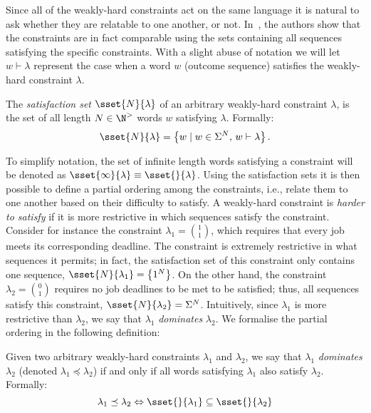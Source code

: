 Since all of the weakly-hard constraints act on the same language it is natural to ask whether they are relatable to one another, or not.
In~\cite{Bernat:2001}, the authors show that the constraints are in fact comparable using the sets containing all sequences satisfying the specific constraints.
With a slight abuse of notation we will let $w \vdash \lambda$ represent the case when a word $w$ (outcome sequence) satisfies the weakly-hard constraint $\lambda$.
%
\begin{definition}
    The \emph{satisfaction set} $\sset{N}{\lambda}$ of an arbitrary weakly-hard constraint $\lambda$, is the set of all length $N \in \N^{>}$ words $w$ satisfying $\lambda$.
    Formally:
    \begin{equation}
        \sset{N}{\lambda} = \left\{ w \mid w \in \Sigma^N,\, w \vdash \lambda \right\}.
    \end{equation}
\end{definition}
%
To simplify notation, the set of infinite length words satisfying a constraint will be denoted as $\sset{\infty}{\lambda} \equiv \sset{}{\lambda}$.
Using the satisfaction sets it is then possible to define a partial ordering among the constraints, i.e., relate them to one another based on their difficulty to satisfy.
A weakly-hard constraint is \emph{harder to satisfy} if it is more restrictive in which sequences satisfy the constraint.
Consider for instance the constraint $\lambda_1 = \binom{1}{1}$, which requires that every job meets its corresponding deadline.
The constraint is extremely restrictive in what sequences it permits; in fact, the satisfaction set of this constraint only contains one sequence, $\sset{N}{\lambda_1} = \left\{ 1^N \right\}$.
On the other hand, the constraint $\lambda_2 = \binom{0}{1}$ requires no job deadlines to be met to be satisfied; thus, all sequences satisfy this constraint, $\sset{N}{\lambda_2} = \Sigma^N$.
Intuitively, since $\lambda_1$ is more restrictive than $\lambda_2$, we say that $\lambda_1$ \emph{dominates} $\lambda_2$.
We formalise the partial ordering in the following definition:
%
\begin{definition}%
    \label{def:kappa:dominance}%
    Given two arbitrary weakly-hard constraints $\lambda_1$ and $\lambda_2$, we say that $\lambda_1$ \emph{dominates} $\lambda_2$ (denoted $\lambda_1 \preceq \lambda_2$) if and only if all words satisfying $\lambda_1$ also satisfy $\lambda_2$.
    Formally:
    \begin{equation}
        \lambda_1 \preceq \lambda_2 \Leftrightarrow \sset{}{\lambda_1} \subseteq \sset{}{\lambda_2}
    \end{equation}
\end{definition}
